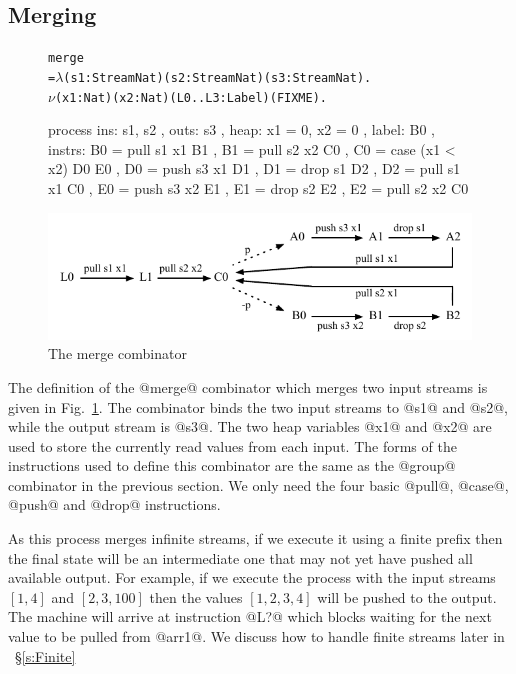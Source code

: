 \subsection{Merging}
\begin{figure}
\begin{alltt}
               merge
                 = \(\lambda\) (s1: Stream Nat) (s2: Stream Nat) (s3: Stream Nat). 
                   \(\nu\) (x1: Nat)  (x2: Nat) (L0..L3: Label) (FIXME).
\end{alltt}
\begin{code}
                   process
                   { ins:    { s1, s2 }
                   , outs:   { s3 }
                   , heap:   { x1 = 0, x2 = 0 }
                   , label:  B0
                   , instrs: { B0 = pull s1 x1     B1 {}
                             , B1 = pull s2 x2     C0 {}
                             , C0 = case (x1 < x2) D0 {}  E0 {}
                             , D0 = push s3 x1     D1 {}
                             , D1 = drop s1        D2 {}
                             , D2 = pull s1 x1     C0 {}
                             , E0 = push s3 x2     E1 {}
                             , E1 = drop s2        E2 {}
                             , E2 = pull s2  x2    C0 {} } }
\end{code}

\medskip
\includegraphics[scale=1.1]{figures/state-merge.pdf}
\caption{The merge combinator}
\label{fig:Process:Merge}
\end{figure}

The definition of the @merge@ combinator which merges two input streams is given in Fig.~\ref{fig:Process:Merge}. The combinator binds the two input streams to @s1@ and @s2@, while the output stream is @s3@. The two heap variables @x1@ and @x2@ are used to store the currently read values from each input. The forms of the instructions used to define this combinator are the same as the @group@ combinator in the previous section. We only need the four basic @pull@, @case@, @push@ and @drop@ instructions.

As this process merges infinite streams, if we execute it using a finite prefix then the final state will be an intermediate one that may not yet have pushed all available output. For example, if we execute the process with the input streams $[1, 4]$ and $[2, 3, 100]$ then the values $[1, 2, 3, 4]$ will be pushed to the output. The machine will arrive at instruction @L?@ which blocks waiting for the next value to be pulled from @arr1@. We discuss how to handle finite streams later in ~\S\ref{s:Finite}


